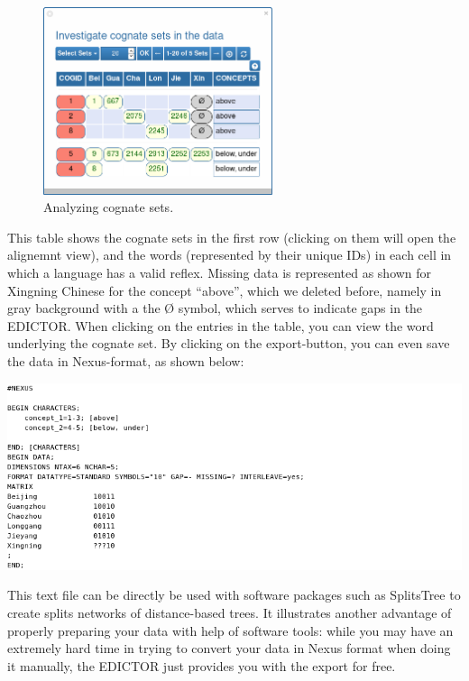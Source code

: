 \documentclass[a4paper,svgnames]{scrartcl}
\begin{document}
\begin{figure}
\centering
\includegraphics[width=0.6\textwidth]{images/figure-21.png}
\caption{Analyzing cognate sets.}
\end{figure}

This table shows the cognate sets in the first row (clicking on them
will open the alignemnt view), and the words (represented by their
unique IDs) in each cell in which a language has a valid reflex. Missing
data is represented as shown for Xingning Chinese for the concept
``above'', which we deleted before, namely in gray background with a the
Ø symbol, which serves to indicate gaps in the EDICTOR. When clicking on
the entries in the table, you can view the word underlying the cognate
set. By clicking on the export-button, you can even save the data in
Nexus-format, as shown below:

\includegraphics[width=\textwidth]{images/code-nexus.png}

This text file can be directly be used with software packages such as
SplitsTree to create splits networks of distance-based trees. It
illustrates another advantage of properly preparing your data with help
of software tools: while you may have an extremely hard time in trying
to convert your data in Nexus format when doing it manually, the EDICTOR
just provides you with the export for free.
\end{document}
